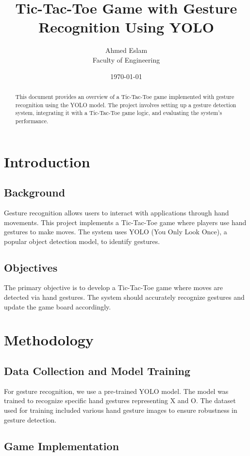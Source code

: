 \documentclass[12pt]{article}
\title{Tic-Tac-Toe Game with Gesture Recognition Using YOLO}
\author{Ahmed Eslam\\
        Faculty of Engineering}
\date{\today}
\begin{document}
\maketitle

\begin{abstract}
    This document provides an overview of a Tic-Tac-Toe game implemented with gesture recognition using the YOLO model. The project involves setting up a gesture detection system, integrating it with a Tic-Tac-Toe game logic, and evaluating the system’s performance.
\end{abstract}

\section{Introduction}
\subsection{Background}
    Gesture recognition allows users to interact with applications through hand movements. This project implements a Tic-Tac-Toe game where players use hand gestures to make moves. The system uses YOLO (You Only Look Once), a popular object detection model, to identify gestures.

\subsection{Objectives}
    The primary objective is to develop a Tic-Tac-Toe game where moves are detected via hand gestures. The system should accurately recognize gestures and update the game board accordingly.

\section{Methodology}
\subsection{Data Collection and Model Training}
    For gesture recognition, we use a pre-trained YOLO model. The model was trained to recognize specific hand gestures representing X and O. The dataset used for training included various hand gesture images to ensure robustness in gesture detection.

\subsection{Game Implementation}
\end{document}
